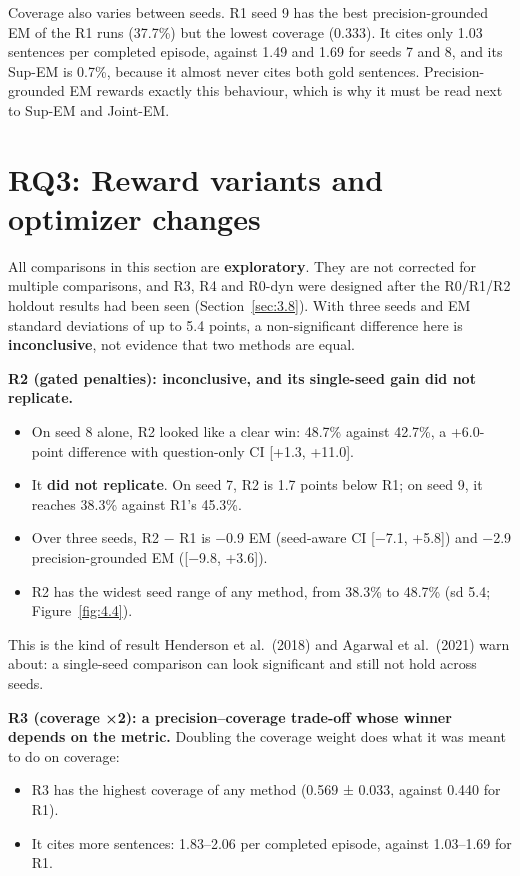 Coverage also varies between seeds. R1 seed 9 has the best
precision-grounded EM of the R1 runs (37.7\%) but the lowest coverage
(0.333). It cites only 1.03 sentences per completed episode, against
1.49 and 1.69 for seeds 7 and 8, and its Sup-EM is 0.7\%, because it
almost never cites both gold sentences. Precision-grounded EM rewards
exactly this behaviour, which is why it must be read next to Sup-EM and
Joint-EM.

\section{RQ3: Reward variants and optimizer changes}\label{sec:4.6}

All comparisons in this section are \textbf{exploratory}. They are not
corrected for multiple comparisons, and R3, R4 and R0-dyn were designed
after the R0/R1/R2 holdout results had been seen
(Section~\ref{sec:3.8}). With three seeds and EM standard deviations of
up to 5.4 points, a non-significant difference here is
\textbf{inconclusive}, not evidence that two methods are equal.

\textbf{R2 (gated penalties): inconclusive, and its single-seed gain did
not replicate.}

\begin{itemize}
\tightlist
\item
  On seed 8 alone, R2 looked like a clear win: 48.7\% against 42.7\%, a
  +6.0-point difference with question-only CI {[}+1.3, +11.0{]}.
\item
  It \textbf{did not replicate}. On seed 7, R2 is 1.7 points below R1;
  on seed 9, it reaches 38.3\% against R1's 45.3\%.
\item
  Over three seeds, R2 − R1 is −0.9 EM (seed-aware CI {[}−7.1, +5.8{]})
  and −2.9 precision-grounded EM ({[}−9.8, +3.6{]}).
\item
  R2 has the widest seed range of any method, from 38.3\% to 48.7\% (sd
  5.4; Figure~\ref{fig:4.4}).
\end{itemize}

This is the kind of result Henderson et al.~(2018) and Agarwal et
al.~(2021) warn about: a single-seed comparison can look significant and
still not hold across seeds.

\textbf{R3 (coverage ×2): a precision--coverage trade-off whose winner
depends on the metric.} Doubling the coverage weight does what it was
meant to do on coverage:

\begin{itemize}
\tightlist
\item
  R3 has the highest coverage of any method (0.569 ± 0.033, against
  0.440 for R1).
\item
  It cites more sentences: 1.83--2.06 per completed episode, against
  1.03--1.69 for R1.
\end{itemize}

